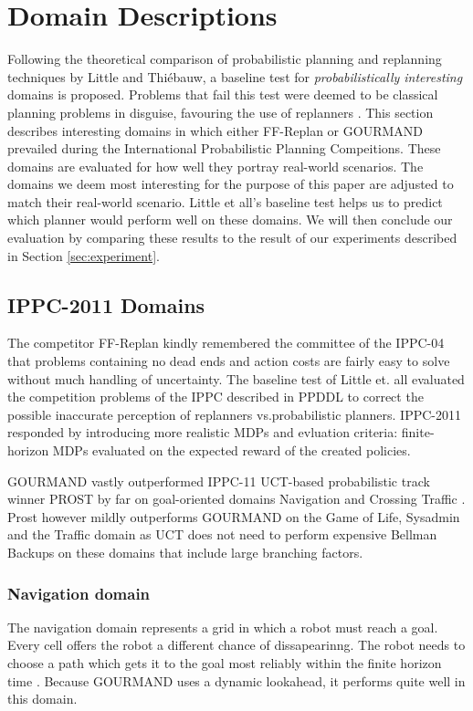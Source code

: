 \documentclass[runningheads,a4paper]{llncs}
\begin{document}
\section{Domain Descriptions}
Following the theoretical comparison of probabilistic planning and replanning techniques by Little and Thi\'ebauw, a baseline test for \emph{probabilistically interesting} domains is proposed. Problems that fail this test were deemed to be classical planning problems in disguise, favouring the use of replanners \cite{little2007probvsreplan}. This section describes interesting domains in which either FF-Replan or GOURMAND prevailed during the International Probabilistic Planning Compeitions. These domains are evaluated for how well they portray real-world scenarios. The domains we deem most interesting for the purpose of this paper are adjusted to match their real-world scenario. Little et all's baseline test helps us to predict which planner would perform well on these domains. We will then conclude our evaluation by comparing these results to the result of our experiments described in Section \ref{sec:experiment}.

\subsection{IPPC-2011 Domains}
The competitor FF-Replan \cite{FFReplan} kindly remembered the committee of the IPPC-04 that problems containing no dead ends and action costs are fairly easy to solve without much handling of uncertainty. The baseline test of Little et. all evaluated the competition problems of the IPPC described in PPDDL to correct the possible inaccurate perception of replanners vs.\@ probabilistic planners. IPPC-2011 responded by introducing more realistic MDPs and evluation criteria: finite-horizon MDPs evaluated on the expected reward of the created policies.

GOURMAND vastly outperformed IPPC-11 UCT-based probabilistic track winner PROST by far on goal-oriented domains Navigation and Crossing Traffic \cite{kolobov2012gourmand}. Prost however mildly outperforms GOURMAND on the Game of Life, Sysadmin and the Traffic domain as UCT does not need to perform expensive Bellman Backups on these domains that include large branching factors. 

\subsubsection{Navigation domain}
The navigation domain represents a grid in which a robot must reach a goal. Every cell offers the robot a different chance of dissapearinng. The robot needs to choose a path which gets it to the goal most reliably within the finite horizon time \cite{sanner2011navigation}. Because GOURMAND uses a dynamic lookahead, it performs quite well in this domain.
\end{document}
